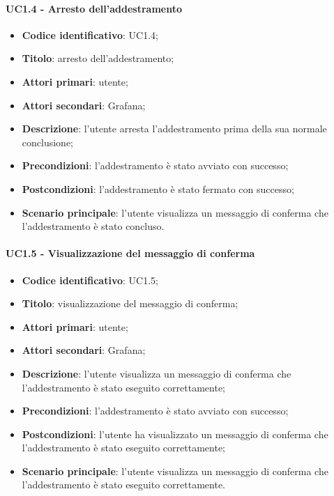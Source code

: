 \paragraph{UC1.4 - Arresto dell'addestramento}
\begin{itemize}
	\item \textbf{Codice identificativo}: UC1.4;
	\item \textbf{Titolo}: arresto dell'addestramento;
	\item \textbf{Attori primari}: utente;
	\item \textbf{Attori secondari}: Grafana\glo;
	\item \textbf{Descrizione}: l'utente arresta l'addestramento prima della sua normale conclusione;
	\item \textbf{Precondizioni}: l'addestramento è stato avviato con successo;
	\item \textbf{Postcondizioni}: l'addestramento è stato fermato con successo;
	\item \textbf{Scenario principale}: l'utente visualizza un messaggio di conferma che l'addestramento è stato concluso.
\end{itemize}

\paragraph{UC1.5 - Visualizzazione del messaggio di conferma}
\begin{itemize}
	\item \textbf{Codice identificativo}: UC1.5;
	\item \textbf{Titolo}: visualizzazione del messaggio di conferma;
	\item \textbf{Attori primari}: utente;
	\item \textbf{Attori secondari}: Grafana\glo;
	\item \textbf{Descrizione}: l'utente visualizza un messaggio di conferma che l'addestramento è stato eseguito correttamente;
	\item \textbf{Precondizioni}: l'addestramento è stato avviato con successo;
	\item \textbf{Postcondizioni}: l'utente ha visualizzato un messaggio di conferma che l'addestramento è stato eseguito correttamente;
	\item \textbf{Scenario principale}: l'utente visualizza un messaggio di conferma che l'addestramento è stato eseguito correttamente.
\end{itemize}

